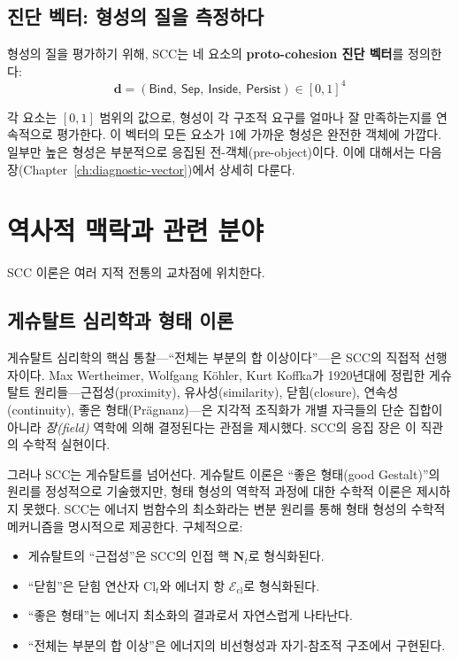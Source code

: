 \subsection{진단 벡터: 형성의 질을 측정하다}

형성의 질을 평가하기 위해, SCC는 네 요소의 \textbf{proto-cohesion 진단 벡터}를 정의한다:
\begin{equation}
    \mathbf{d} = (\mathsf{Bind},\ \mathsf{Sep},\ \mathsf{Inside},\ \mathsf{Persist}) \in [0,1]^4
    \label{eq:diagnostic-vector-preview}
\end{equation}

각 요소는 $[0,1]$ 범위의 값으로, 형성이 각 구조적 요구를 얼마나 잘 만족하는지를 연속적으로 평가한다. 이 벡터의 모든 요소가 1에 가까운 형성은 완전한 객체에 가깝다. 일부만 높은 형성은 부분적으로 응집된 전-객체(pre-object)이다. 이에 대해서는 다음 장(Chapter~\ref{ch:diagnostic-vector})에서 상세히 다룬다.


\section{역사적 맥락과 관련 분야}
\label{sec:historical-context}

SCC 이론은 여러 지적 전통의 교차점에 위치한다.


\subsection{게슈탈트 심리학과 형태 이론}

게슈탈트 심리학의 핵심 통찰---``전체는 부분의 합 이상이다''---은 SCC의 직접적 선행자이다. Max Wertheimer, Wolfgang K\"ohler, Kurt Koffka가 1920년대에 정립한 게슈탈트 원리들---근접성(proximity), 유사성(similarity), 닫힘(closure), 연속성(continuity), 좋은 형태(Pr\"agnanz)---은 지각적 조직화가 개별 자극들의 단순 집합이 아니라 \emph{장(field)} 역학에 의해 결정된다는 관점을 제시했다. SCC의 응집 장은 이 직관의 수학적 실현이다.

그러나 SCC는 게슈탈트를 넘어선다. 게슈탈트 이론은 ``좋은 형태(good Gestalt)''의 원리를 정성적으로 기술했지만, 형태 형성의 역학적 과정에 대한 수학적 이론은 제시하지 못했다. SCC는 에너지 범함수의 최소화라는 변분 원리를 통해 형태 형성의 수학적 메커니즘을 명시적으로 제공한다. 구체적으로:
\begin{itemize}
    \item 게슈탈트의 ``근접성''은 SCC의 인접 핵 $\mathbf{N}_t$로 형식화된다.
    \item ``닫힘''은 닫힘 연산자 $\mathrm{Cl}_t$와 에너지 항 $\mathcal{E}_{\mathrm{cl}}$로 형식화된다.
    \item ``좋은 형태''는 에너지 최소화의 결과로서 자연스럽게 나타난다.
    \item ``전체는 부분의 합 이상''은 에너지의 비선형성과 자기-참조적 구조에서 구현된다.
\end{itemize}

